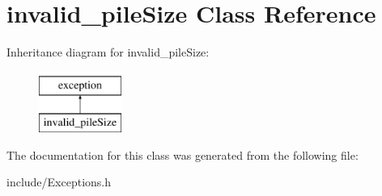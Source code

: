 \hypertarget{classinvalid__pile_size}{}\section{invalid\+\_\+pile\+Size Class Reference}
\label{classinvalid__pile_size}
Inheritance diagram for invalid\+\_\+pile\+Size\+:\begin{figure}[H]
\begin{center}
\leavevmode
\includegraphics[height=2.000000cm]{classinvalid__pile_size}
\end{center}
\end{figure}


The documentation for this class was generated from the following file\+:\begin{DoxyCompactItemize}
\item 
include/Exceptions.\+h\end{DoxyCompactItemize}
